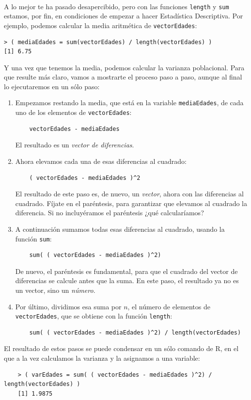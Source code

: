 \documentclass[10pt,a4paper]{article}\usepackage[]{graphicx}\usepackage[]{color}
\newcounter {cont01}
\begin{document}
\paragraph*{}\label{tut02:lugar:CalculoManualMediaAritmetica} A lo mejor te ha pasado desapercibido, pero con las funciones {\tt length} y {\tt sum} estamos, por fin, en condiciones de empezar a hacer Estadística Descriptiva. Por ejemplo, podemos calcular la media aritmética de {\tt vectorEdades}:
\begin{verbatim}
> ( mediaEdades = sum(vectorEdades) / length(vectorEdades) )
[1] 6.75
\end{verbatim}
Y una vez que tenemos la media, podemos calcular la varianza poblacional. Para que resulte más claro, vamos a mostrarte el proceso paso a paso, aunque al final lo ejecutaremos en un sólo paso:
\begin{enumerate}
  \item Empezamos restando la media, que está en la variable {\tt mediaEdades}, de cada uno de los elementos de {\tt vectorEdades}:
    \begin{verbatim}
    vectorEdades - mediaEdades
    \end{verbatim}
      El resultado es un {\em vector de diferencias}.
  \item Ahora elevamos cada una de esas diferencias al cuadrado:
    \begin{verbatim}
    ( vectorEdades - mediaEdades )^2
    \end{verbatim}
    El resultado de este paso es, de nuevo, un {\em vector}, ahora con las diferencias al cuadrado. Fíjate en el paréntesis, para garantizar que elevamos al cuadrado la diferencia. Si no incluyéramos el paréntesis ¿qué calcularíamos?
  \item A continuación sumamos todas esas diferencias al cuadrado, usando la función {\tt sum}:
    \begin{verbatim}
    sum( ( vectorEdades - mediaEdades )^2)
    \end{verbatim}
    De nuevo, el paréntesis es fundamental, para que el cuadrado del vector de diferencias se calcule antes que la suma. En este paso, el resultado ya no es un vector, sino un {\em número}.
  \item Por último, dividimos esa suma por $n$, el número de elementos de {\tt vectorEdades}, que se obtiene con la función {\tt length}:
    \begin{verbatim}
    sum( ( vectorEdades - mediaEdades )^2) / length(vectorEdades)
    \end{verbatim}
\end{enumerate}
El resultado de estos pasos se puede condensar en un sólo comando de R, en el que a la vez calculamos la varianza y la asignamos a una variable:
        \begin{verbatim}
    > ( varEdades = sum( ( vectorEdades - mediaEdades )^2) / length(vectorEdades) )
    [1] 1.9875
        \end{verbatim}
\end{document}
